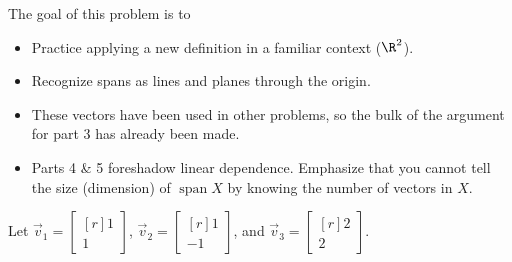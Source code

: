\documentclass{problemset}
\DeclareMathOperator{\Span}{span}
\newcommand{\mat}[1]{\begin{bmatrix*}[r]#1\end{bmatrix*}}
\begin{document}
	\question
	\begin{annotation}
		\begin{goals}

			The goal of this problem is to
			\begin{itemize}
				\item Practice applying a new definition in a familiar context ($\R^2$).
				\item Recognize spans as lines and planes through the origin.
			\end{itemize}
		\end{goals}

		\begin{notes}
			\begin{itemize}
				\item These vectors have been used in other problems,
					so the bulk of the argument for part 3 has
					already been made.
				\item Parts 4 \& 5 foreshadow linear dependence. Emphasize
					that you cannot tell the size (dimension) of $\Span X$
					by knowing the number of vectors in $X$.
			\end{itemize}
		\end{notes}
	\end{annotation}
	Let $\vec v_1=\mat{1\\1}$, $\vec v_2=\mat{1\\-1}$, and $\vec v_3=\mat{2\\2}$.
\end{document}

